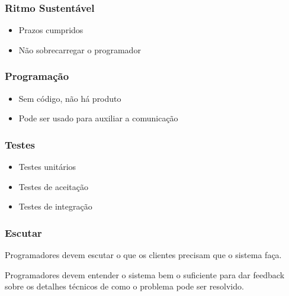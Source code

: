 \documentclass[10pt]{beamer}
\begin{document}
\begin{frame}
  \frametitle{Ritmo Sustentável}
  \begin{itemize}
  \item Prazos cumpridos
  \item Não sobrecarregar o programador
  \end{itemize}
\end{frame}

\begin{frame}
  \frametitle{Programação}
  \begin{itemize}
  \item Sem código, não há produto
  \item Pode ser usado para auxiliar a comunicação
  \end{itemize}
\end{frame}

\begin{frame}
  \frametitle{Testes}
  \begin{itemize}
  \item Testes unitários
  \item Testes de aceitação
  \item Testes de integração
  \end{itemize}
\end{frame}

\begin{frame}
  \frametitle{Escutar}
  Programadores devem escutar o que os clientes precisam que o sistema faça.

  \pause
  Programadores devem entender o sistema bem o suficiente para dar feedback
  sobre os detalhes técnicos de como o problema pode ser resolvido.
\end{frame}
\end{document}
